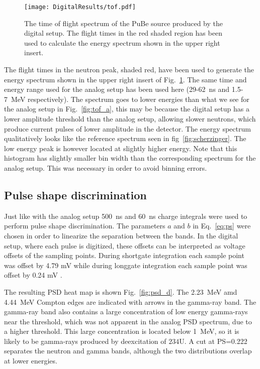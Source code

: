 \documentclass[main.tex]{subfiles}
\begin{document}
\begin{figure}[ht]
    \centering
        \texttt{[image: DigitalResults/tof.pdf]}
        \caption[Time of flight spectrum, digital setup.]{The time of flight spectrum of the PuBe source produced by the digital setup. The flight times in the red shaded region has been used to calculate the energy spectrum shown in the upper right insert.}
    \label{fig:tof_d} 
\end{figure}

The flight times in the neutron peak, shaded red, have been used to generate the energy spectrum shown in the upper right insert of Fig.~\ref{fig:tof_d}. The same time and energy range used for the analog setup has been used here (29-\SI{62}{\ns} and 1.5-\SI{7}{\MeV} respectively). The spectrum goes to lower energies than what we see for the analog setup in Fig.~\ref{fig:tof_a}, this may be because the digital setup has a lower amplitude threshold than the analog setup, allowing slower neutrons, which produce current pulses of lower amplitude in the detector. The energy spectrum qualitatively looks like the reference spectrum seen in fig~\ref{fig:scherzinger}. The low energy peak is however located at slightly higher energy. Note that this histogram has slightly smaller bin width than the corresponding spectrum for the analog setup. This was necessary in order to avoid binning errors.

\subsection{Pulse shape discrimination}
Just like with the analog setup \SI{500}{ns} and \SI{60}{ns} charge integrals were used to perform pulse shape discrimination. The parameters $a$ and $b$ in Eq.~\ref{eq:ps} were chosen in order to linearize the separation between the bands. In the digital setup, where each pulse is digitized, these offsets can be interpreted as voltage offsets of the sampling points. During shortgate integration each sample point was offset by 4.79 mV while during longgate integration each sample point was offset by 0.24 mV .

The resulting PSD heat map is shown Fig.~\ref{fig:psd_d}. The \SI{2.23}{\MeV} amd \SI{4.44}{MeV} Compton edges are indicated with arrows in the gamma-ray band. The gamma-ray band also contains a large concentration of low energy gamma-rays near the threshold, which was not apparent in the analog PSD spectrum, due to a higher threshold. This large concentration is located below \SI{1}{MeV}, so it is likely to be gamma-rays produced by deexcitation of $\text{234}$U.
A cut at PS=0.222 separates the neutron and gamma bands, although the two distributions overlap at lower energies.
\end{document}
